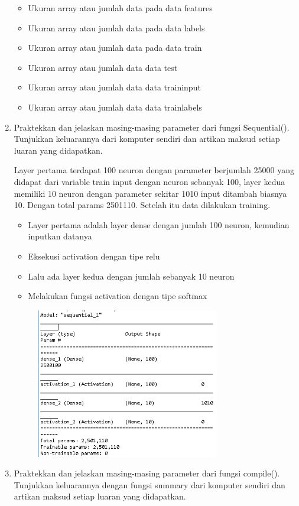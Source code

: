 \begin{enumerate}
\begin{figure}[H]
	\end{figure}
	\begin{itemize}
		\item Ukuran array atau jumlah data pada data features
		\item Ukuran array atau jumlah data pada data labels
		\item Ukuran array atau jumlah data pada data train
		\item Ukuran array atau jumlah data data test
		\item Ukuran array atau jumlah data data traininput
		\item Ukuran array atau jumlah data data trainlabels
	\end{itemize}
	\item Praktekkan dan jelaskan masing-masing parameter dari fungsi Sequential(). Tunjukkan keluarannya dari komputer sendiri dan artikan maksud setiap luaran yang didapatkan.
	\hfill\break
	
	Layer pertama terdapat 100 neuron dengan parameter berjumlah 25000 yang didapat dari variable train input dengan neuron sebanyak 100, layer kedua memiliki 10 neuron dengan parameter sekitar 1010 input ditambah biasnya 10. Dengan total params 2501110. Setelah itu data dilakukan training.
	\begin{itemize}
		\item Layer pertama adalah layer dense dengan jumlah 100 neuron, kemudian inputkan datanya
		\item Eksekusi activation dengan tipe relu
		\item Lalu ada layer kedua dengan jumlah sebanyak 10 neuron
		\item Melakukan fungsi activation dengan tipe softmax
	\end{itemize}
	\hfill\break
	\begin{figure}[H]
		\includegraphics[width=8cm]{figures/1174071/6/7.PNG}
		\centering
	\end{figure}	
	\item Praktekkan dan jelaskan masing-masing parameter dari fungsi compile(). Tunjukkan keluarannya dengan fungsi summary dari komputer sendiri dan artikan maksud setiap luaran yang didapatkan.
	\hfill\break
	


\end{enumerate}
